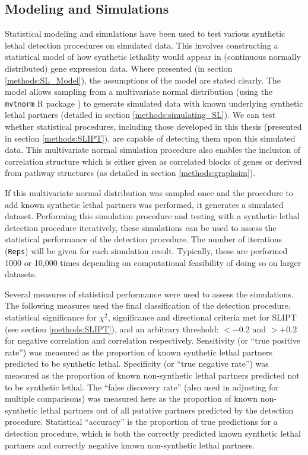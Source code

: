 \subsection{Modeling and Simulations} \label{methods:simulation}
Statistical modeling and simulations have been used to test various synthetic lethal detection procedures on simulated data. This involves constructing a statistical model of how synthetic lethality would appear in (continuous normally distributed) gene expression data. Where presented (in section \ref{methods:SL_Model}), the assumptions of the model are stated clearly. The model allows sampling from a multivariate normal distribution (using the \texttt{mvtnorm} R package \citep{Genz2009, mvtnorm}) to generate simulated data with known underlying synthetic lethal partners (detailed in section \ref{methods:simulating_SL}). We can test whether statistical procedures, including those developed in this thesis (presented in section \ref{methods:SLIPT}), are capable of detecting them upon this simulated data. This multivariate normal simulation procedure also enables the inclusion of correlation structure which is either given as correlated blocks of genes or derived from pathway structures (as detailed in section \ref{methods:graphsim}).

If this multivariate normal distribution was sampled once and the procedure to add known synthetic lethal partners was performed, it generates a simulated dataset. Performing this simulation procedure and testing with a synthetic lethal detection procedure iteratively, these simulations can be used to assess the statistical performance of the detection procedure. The number of iterations (\texttt{Reps}) will be given for each simulation result. Typically, these are performed 1000 or 10,000 times depending on computational feasibility of doing so on larger datasets. 

Several measures of statistical performance were used to assess the simulations. The following measures used the final classification of the detection procedure, statistical significance for $\chi^2$, significance and directional criteria met for SLIPT (see section \ref{methods:SLIPT}), and an arbitrary threshold: $<-0.2$ and $>+0.2$ for  negative correlation and correlation respectively. Sensitivity (or ``true positive rate'') was measured as the proportion of known synthetic lethal partners predicted to be synthetic lethal. Specificity (or ``true negative rate'') was measured as the proportion of known non-synthetic lethal partners predicted not to be synthetic lethal. The ``false discovery rate'' (also used in adjusting for multiple comparisons) was measured here as the proportion of known non-synthetic lethal partners out of all putative partners predicted by the detection procedure. Statistical ``accuracy'' is the proportion of true predictions for a detection procedure, which is both the correctly predicted known synthetic lethal partners and correctly negative known non-synthetic lethal partners.

